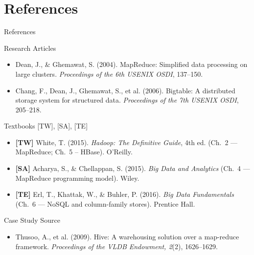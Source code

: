 \documentclass[aspectratio=169,10pt]{beamer}
\begin{document}
\section*{References}

\begin{frame}{References}
  \begin{block}{Research Articles}
    \begin{itemize}
      \item Dean, J., \& Ghemawat, S. (2004).
            MapReduce: Simplified data processing on large clusters.
            \textit{Proceedings of the 6th USENIX OSDI}, 137--150.
      \item Chang, F., Dean, J., Ghemawat, S., et al. (2006).
            Bigtable: A distributed storage system for structured data.
            \textit{Proceedings of the 7th USENIX OSDI}, 205--218.
    \end{itemize}
  \end{block}
  \vspace{4pt}
  \begin{block}{Textbooks \textmd{[TW], [SA], [TE]}}
    \begin{itemize}
      \item \textbf{[TW]} White, T. (2015).
            \textit{Hadoop: The Definitive Guide}, 4th ed.
            (Ch.~2 — MapReduce; Ch.~5 -- HBase). O'Reilly.
      \item \textbf{[SA]} Acharya, S., \& Chellappan, S. (2015).
            \textit{Big Data and Analytics}
            (Ch.~4 — MapReduce programming model). Wiley.
      \item \textbf{[TE]} Erl, T., Khattak, W., \& Buhler, P. (2016).
            \textit{Big Data Fundamentals}
            (Ch.~6 — NoSQL and column-family stores). Prentice Hall.
    \end{itemize}
  \end{block}
  \vspace{4pt}
  \begin{block}{Case Study Source}
    \begin{itemize}
      \item Thusoo, A., et al. (2009).
            Hive: A warehousing solution over a map-reduce framework.
            \textit{Proceedings of the VLDB Endowment, 2}(2), 1626--1629.
    \end{itemize}
  \end{block}
\end{frame}
\end{document}
